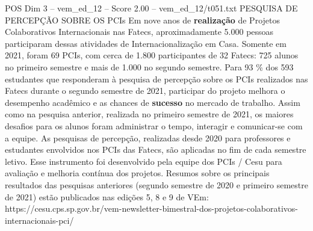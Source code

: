 \begin{textsample}{POS Dim 3 – vem\_ed\_12 – Score 2.00 – vem\_ed\_12/t051.txt}  \label{ex:f3_pos_161}
PESQUISA DE PERCEPÇÃO SOBRE OS PCIs Em nove anos de \textbf{realização} de Projetos Colaborativos Internacionais nas Fatecs, aproximadamente 5.000 pessoas participaram dessas atividades de Internacionalização em Casa.
Somente em 2021, foram 69 PCIs, com cerca de 1.800 participantes de 32 Fatecs: 725 alunos no primeiro semestre e mais de 1.000 no segundo semestre.
Para 93 \% dos 593 estudantes que responderam à pesquisa de percepção sobre os PCIs realizados nas Fatecs durante o segundo semestre de 2021, participar do projeto melhora o desempenho acadêmico e as chances de \textbf{sucesso} no mercado de trabalho.
Assim como na pesquisa anterior, realizada no primeiro semestre de 2021, os maiores desafios para os alunos foram administrar o tempo, interagir e comunicar-se com a equipe.
As pesquisas de percepção, realizadas desde 2020 para professores e estudantes envolvidos nos PCIs das Fatecs, são aplicadas no fim de cada semestre letivo.
Esse instrumento foi desenvolvido pela equipe dos PCIs / Cesu para avaliação e melhoria contínua dos projetos.
Resumos sobre os principais resultados das pesquisas anteriores (segundo semestre de 2020 e primeiro semestre de 2021) estão publicados nas edições 5, 8 e 9 de VEm: https://cesu.cps.sp.gov.br/vem-newsletter-bimestral-dos-projetos-colaborativos-internacionais-pci/

\end{textsample}
